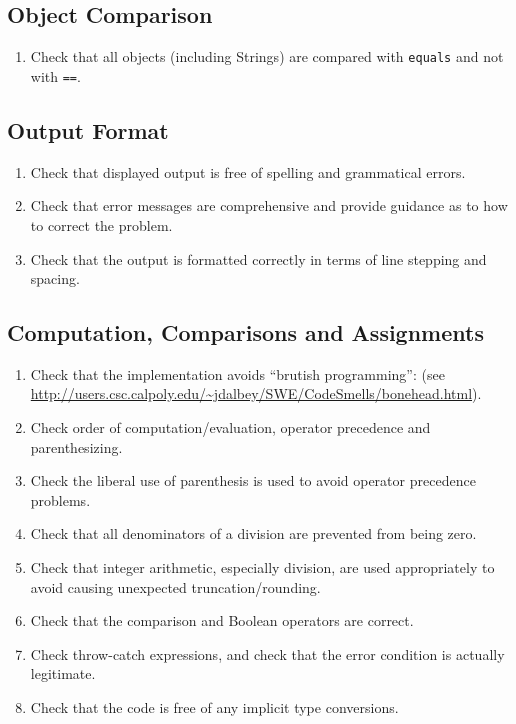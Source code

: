 \subsection*{Object Comparison}\begin{enumerate}[resume, label=C\arabic*., ref=C\arabic*]
\item \checklistref Check that all objects (including Strings) are compared with \texttt{equals} and not with \texttt{==}.
\end{enumerate}

\subsection*{Output Format}\begin{enumerate}[resume, label=C\arabic*., ref=C\arabic*]
\item \checklistref Check that displayed output is free of spelling and grammatical errors.
\item \checklistref Check that error messages are comprehensive and provide guidance as to how to correct the problem.
\item \checklistref Check that the output is formatted correctly in terms of line stepping and spacing.
\end{enumerate}

\subsection*{Computation, Comparisons and Assignments}\begin{enumerate}[resume, label=C\arabic*., ref=C\arabic*]
\item \checklistref Check that the implementation avoids ``brutish programming'': (see \url{http://users.csc.calpoly.edu/~jdalbey/SWE/CodeSmells/bonehead.html}). 
\item \checklistref Check order of computation/evaluation, operator precedence and parenthesizing.
\item \checklistref Check the liberal use of parenthesis is used to avoid operator precedence problems.
\item \checklistref Check that all denominators of a division are prevented from being zero.
\item \checklistref Check that integer arithmetic, especially division, are used appropriately to avoid causing unexpected truncation/rounding.
\item \checklistref Check that the comparison and Boolean operators are correct.
\item \checklistref Check throw-catch expressions, and check that the error condition is actually legitimate.
\item \checklistref Check that the code is free of any implicit type conversions.
\end{enumerate}

